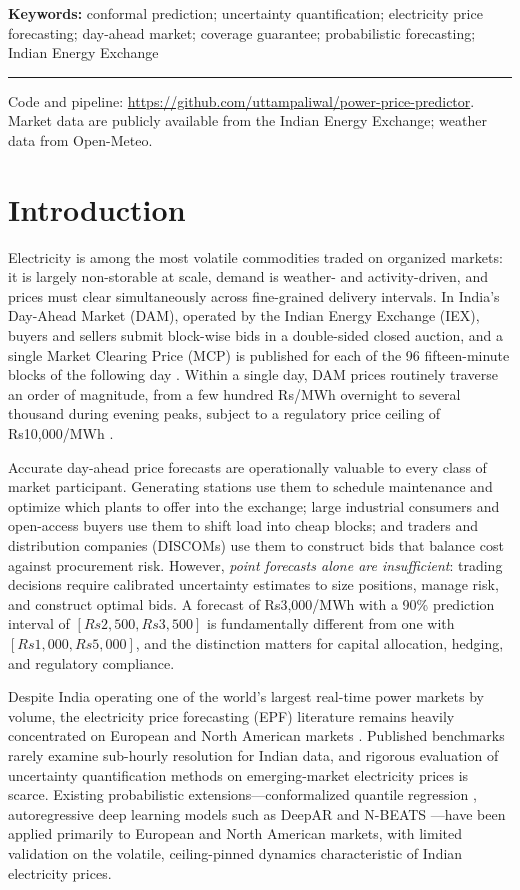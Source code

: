 \documentclass[preprint,12pt]{elsarticle}
\newcommand{\Rs}{Rs}
\begin{document}
\noindent\textbf{Keywords:} conformal prediction; uncertainty quantification; electricity price forecasting; day-ahead market; coverage guarantee; probabilistic forecasting; Indian Energy Exchange

\noindent\rule{\textwidth}{0.4pt}
\noindent\small Code and pipeline: \url{https://github.com/uttampaliwal/power-price-predictor}. Market data are publicly available from the Indian Energy Exchange; weather data from Open-Meteo. \normalsize

\section{Introduction}\label{sec:intro}

Electricity is among the most volatile commodities traded on organized markets: it is largely non-storable at scale, demand is weather- and activity-driven, and prices must clear simultaneously across fine-grained delivery intervals. In India's Day-Ahead Market (DAM), operated by the Indian Energy Exchange (IEX), buyers and sellers submit block-wise bids in a double-sided closed auction, and a single Market Clearing Price (MCP) is published for each of the 96 fifteen-minute blocks of the following day \cite{iexdata}. Within a single day, DAM prices routinely traverse an order of magnitude, from a few hundred \Rs/MWh overnight to several thousand during evening peaks, subject to a regulatory price ceiling of \Rs10{,}000/MWh \cite{cerc}.

Accurate day-ahead price forecasts are operationally valuable to every class of market participant. Generating stations use them to schedule maintenance and optimize which plants to offer into the exchange; large industrial consumers and open-access buyers use them to shift load into cheap blocks; and traders and distribution companies (DISCOMs) use them to construct bids that balance cost against procurement risk. However, \emph{point forecasts alone are insufficient}: trading decisions require calibrated uncertainty estimates to size positions, manage risk, and construct optimal bids. A forecast of \Rs3{,}000/MWh with a 90\% prediction interval of $[\Rs2{,}500, \Rs3{,}500]$ is fundamentally different from one with $[\Rs1{,}000, \Rs5{,}000]$, and the distinction matters for capital allocation, hedging, and regulatory compliance.

Despite India operating one of the world's largest real-time power markets by volume, the electricity price forecasting (EPF) literature remains heavily concentrated on European and North American markets \cite{weron2014,lago2021}. Published benchmarks rarely examine sub-hourly resolution for Indian data, and rigorous evaluation of uncertainty quantification methods on emerging-market electricity prices is scarce. Existing probabilistic extensions---conformalized quantile regression \citep{romano2019}, autoregressive deep learning models such as DeepAR \citep{salinas2020} and N-BEATS \citep{oreshkin2020}---have been applied primarily to European and North American markets, with limited validation on the volatile, ceiling-pinned dynamics characteristic of Indian electricity prices.
\end{document}
